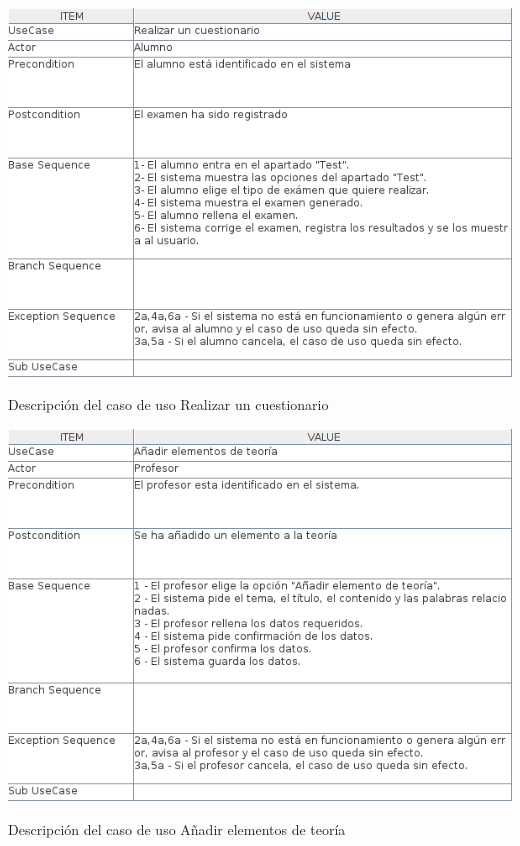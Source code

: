 \documentclass[openright,twoside,10pt]{book}
\begin{document}
    \vspace*{\fill}
    
    \newpage
    
    \vspace*{\fill}
    
    \begin{table}[H]
        \begin{center}
            \includegraphics[width=\textwidth]{img/astah/analisis/casos_de_uso/useCase05.png}
        \end{center}
        \caption{Descripción del caso de uso Realizar un cuestionario}
    \end{table}
    
    \vspace*{\fill}
    
    \newpage
    
    \vspace*{\fill}
    
    \begin{table}[H]
        \begin{center}
            \includegraphics[width=\textwidth]{img/astah/analisis/casos_de_uso/useCase06.png}
        \end{center}
        \caption{Descripción del caso de uso Añadir elementos de teoría}
    \end{table}
    
\end{document}
